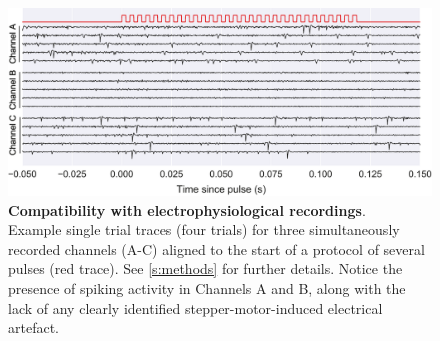 \begin{figure}[ht] 
	\centering
	\includegraphics[width=1.0\linewidth]{Figures/Artboard 7.pdf}
	\caption{\textbf{Compatibility with electrophysiological recordings}.\\
	Example single trial traces (four trials) for three simultaneously recorded channels (A-C) aligned to the start of a protocol of several pulses (red trace). See \ref{s:methods} for further details. Notice the presence of spiking activity in Channels A and B, along with the lack of any clearly identified stepper-motor-induced electrical artefact.}	
	\label{fig:Ephys}
\end{figure}




